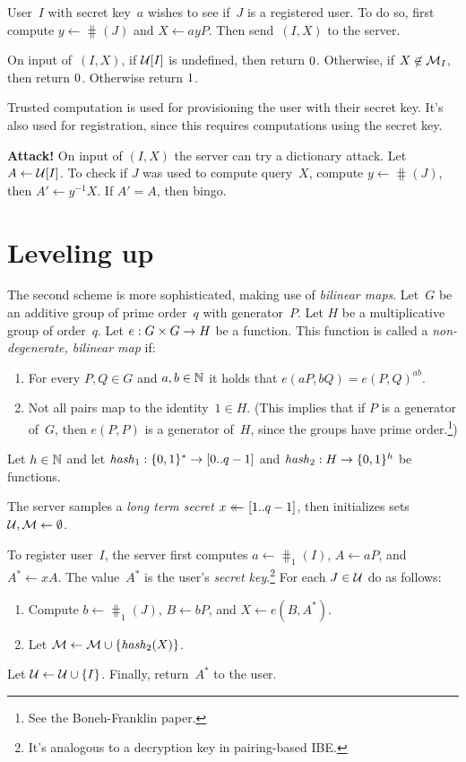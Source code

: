 \documentclass{build/llncs}
\begin{document}
%
User~$I$ with secret key~$a$ wishes to see if~$J$ is a registered user. To do
so, first compute $y \gets \hash(J)$ and $X \gets ay P$.
%
Then send~$(I, X)$ to the server.

%
On input of~$(I, X)$, if $\mathcal{U}[I]$ is undefined, then return $0$.
%
Otherwise, if $X \not\in \mathcal{M}_I$, then return $0$.
%
Otherwise return $1$.

%
Trusted computation is used for provisioning the user with their secret key.
It's also used for registration, since this requires computations using the
secret key.

\noindent\textbf{\color{red}Attack!}
%
On input of $(I, X)$ the server can try a dictionary attack. Let $A \gets
\mathcal{U}[I]$. To check if $J$ was used to compute query~$X$, compute $y \gets \hash(J)$, then
$A' \gets y^{-1}X$. If $A' = A$, then bingo.

\newpage
\section*{Leveling up}

The second scheme is more sophisticated, making use of \emph{bilinear maps}.
%
Let~$G$ be an additive group of prime order~$q$ with generator~$P$.
%
Let $H$ be a multiplicative group of order~$q$.
%
Let $e : G \times G \to H$ be a function. This function is called a \emph{non-degenerate, bilinear map}
if:
\begin{enumerate}
  \item For every $P, Q \in G$ and $a, b \in \mathbb{N}$ it holds that $e(aP, bQ) = e(P,
    Q)^{ab}$.
  \item Not all pairs map to the identity~$1\in H$. (This implies that if $P$ is
    a generator of~$G$, then $e(P, P)$ is a generator of~$H$, since the
    groups have prime order.\footnote{See the Boneh-Franklin paper.})
\end{enumerate}
%
Let $h\in\mathbb{N}$ and let $\mathit{hash}_1 : \{0,1\}^* \to [0..q-1]$ and $\mathit{hash}_2 : H \to
\{0,1\}^h$ be functions.

%
The server samples a \emph{long term secret} $x \mathrel{\leftarrow\mkern-14mu\leftarrow} [1..q-1]$, then
initializes sets~$\mathcal{U}, \mathcal{M} \gets \emptyset$.

%
To register user~$I$, the server first computes $a \gets \hash_1(I)$, $A \gets aP$, and $A^*
\gets xA$. The value~$A^*$ is the user's \emph{secret key}.\footnote{It's
analogous to a decryption key in pairing-based IBE.}
%
For each $J \in \mathcal{U}$ do as follows:
%
\begin{enumerate}
  \item Compute $b \gets \hash_1(J)$, $B \gets bP$, and $X \gets e(B, A^*)$.
  \item Let $\mathcal{M} \gets \mathcal{M} \cup \{\mathit{hash}_2(X)\}$.
\end{enumerate}
%
Let $\mathcal{U} \gets \mathcal{U} \cup \{I\}$.
%
Finally, return~$A^*$ to the user.
\end{document}
